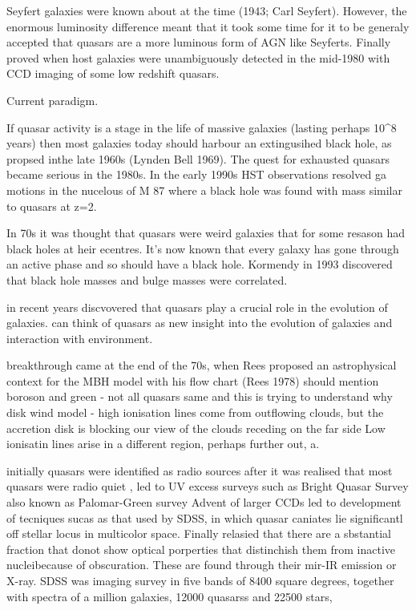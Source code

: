 Seyfert galaxies were known about at the time (1943; Carl Seyfert). 
However, the enormous luminosity difference meant that it took some time for it to be generaly accepted that quasars are a more luminous form of AGN like Seyferts.  
Finally proved when host galaxies were unambiguously detected in the mid-1980 with CCD imaging of some low redshift quasars.

Current paradigm. 

If quasar activity is a stage in the life of massive galaxies (lasting perhaps 10^8 years) then most galaxies today should harbour an extingusihed black hole, as propsed inthe late 1960s (Lynden Bell 1969). The quest for exhausted quasars became serious in the 1980s. In the early 1990s HST observations resolved ga motions in the nucelous of M 87 where a black hole was found with mass similar to quasars at z=2. 



In 70s it was thought that quasars were weird galaxies that for some resason had black holes at heir ecentres. 
It's now known that every galaxy has gone through an active phase and so should have a black hole. 
Kormendy in 1993 discovered that black hole masses and bulge masses were correlated. 



in recent years discvovered that quasars play a crucial role in the evolution of galaxies. can think of quasars as new insight into the evolution of galaxies and interaction with environment. 



breakthrough came at the end of the 70s, when Rees proposed an astrophysical context for the MBH model with his flow chart (Rees 1978)
should mention boroson and green - not all quasars same and this is trying to understand why 
disk wind model - high ionisation lines come from outflowing clouds, but the accretion disk is blocking our view of the clouds receding on the far side
Low ionisatin lines arise in a different region, perhaps further out, a. 





initially quasars were identified as radio sources
after it was realised that most quasars were radio quiet , led to UV excess surveys such as Bright Quasar Survey also known as Palomar-Green survey
Advent of larger CCDs led to development of tecniques sucas as that used by SDSS, in which quasar caniates lie significantl off stellar locus in multicolor space. 
Finally relasied that there are a sbstantial fraction that donot show optical porperties that distinchish them from inactive nucleibecause of obscuration. 
These are found through their mir-IR emission or X-ray. 
SDSS was imaging survey in five bands of 8400 square degrees, together with spectra of a million galaxies, 12000 quasarss and 22500 stars, 

